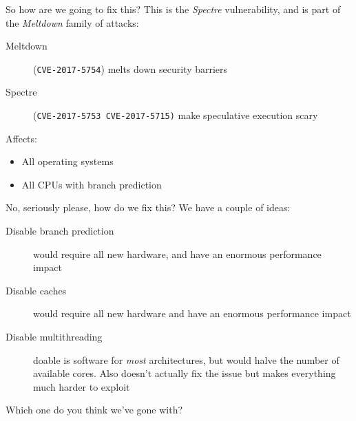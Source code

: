 \documentclass[9pt,aspectratio=169]{beamer}
\begin{document}
\begin{frame}[label={sec:org8ec39d0},fragile]{So how are we going to fix this?}
 This is the \emph{Spectre} vulnerability, and is part of the \emph{Meltdown} family of attacks:
\begin{description}
\item[{Meltdown}] (\texttt{CVE-2017-5754}) melts down security barriers
\item[{Spectre}] (\texttt{CVE-2017-5753 CVE-2017-5715)} make speculative execution scary
\end{description}

Affects:
\begin{itemize}
\item All operating systems
\item All CPUs with branch prediction
\end{itemize}
\end{frame}

\begin{frame}[label={sec:org2ec8924}]{No, seriously please, how do we fix this?}
We have a couple of ideas:

\begin{description}
\item[{Disable branch prediction}] would require all new hardware, and have an enormous performance impact
\item[{Disable caches}] would require all new hardware and have an enormous performance impact
\item[{Disable multithreading}] doable is software for \emph{most} architectures, but would halve the number of available cores.  Also doesn't actually fix the issue but makes everything much harder to exploit
\end{description}

Which one do you think we've gone with?
\end{frame}
\end{document}
